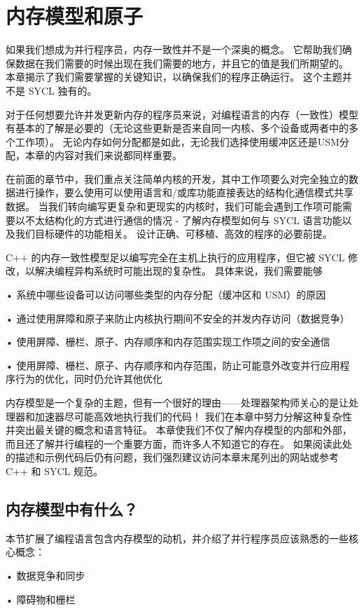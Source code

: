 \section{内存模型和原子}
如果我们想成为并行程序员，内存一致性并不是一个深奥的概念。 它帮助我们确保数据在我们需要的时候出现在我们需要的地方，并且它的值是我们所期望的。 本章揭示了我们需要掌握的关键知识，以确保我们的程序正确运行。 这个主题并不是 SYCL 独有的。

对于任何想要允许并发更新内存的程序员来说，对编程语言的内存（一致性）模型有基本的了解是必要的（无论这些更新是否来自同一内核、多个设备或两者中的多个工作项）。 无论内存如何分配都是如此，无论我们选择使用缓冲区还是USM分配，本章的内容对我们来说都同样重要。

在前面的章节中，我们重点关注简单内核的开发，其中工作项要么对完全独立的数据进行操作，要么使用可以使用语言和/或库功能直接表达的结构化通信模式共享数据。 当我们转向编写更复杂和更现实的内核时，我们可能会遇到工作项可能需要以不太结构化的方式进行通信的情况 - 了解内存模型如何与 SYCL 语言功能以及我们目标硬件的功能相关。 设计正确、可移植、高效的程序的必要前提。

C++ 的内存一致性模型足以编写完全在主机上执行的应用程序，但它被 SYCL 修改，以解决编程异构系统时可能出现的复杂性。 具体来说，我们需要能够

• 系统中哪些设备可以访问哪些类型的内存分配（缓冲区和 USM）的原因

• 通过使用屏障和原子来防止内核执行期间不安全的并发内存访问（数据竞争）

• 使用屏障、栅栏、原子、内存顺序和内存范围实现工作项之间的安全通信

• 使用屏障、栅栏、原子、内存顺序和内存范围，防止可能意外改变并行应用程序行为的优化，同时仍允许其他优化

内存模型是一个复杂的主题，但有一个很好的理由——处理器架构师关心的是让处理器和加速器尽可能高效地执行我们的代码！ 我们在本章中努力分解这种复杂性并突出最关键的概念和语言特征。 本章使我们不仅了解内存模型的内部和外部，而且还了解并行编程的一个重要方面，而许多人不知道它的存在。 如果阅读此处的描述和示例代码后仍有问题，我们强烈建议访问本章末尾列出的网站或参考 C++ 和 SYCL 规范。

\subsection{内存模型中有什么？}
本节扩展了编程语言包含内存模型的动机，并介绍了并行程序员应该熟悉的一些核心概念：

• 数据竞争和同步

• 障碍物和栅栏

